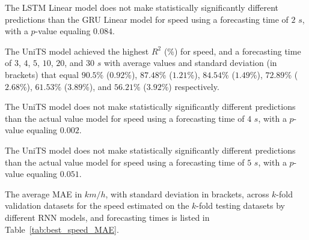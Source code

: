 The LSTM Linear model does not make statistically significantly different predictions than the GRU Linear model for speed using a forecasting time of $2$ $s$, with a $p$-value equaling $0.084$.

The UniTS model achieved the highest $R^{2}$ (\%) for speed, and a forecasting time of $3$, $4$, $5$, $10$, $20$, and $30$ $s$ with average values and standard deviation (in brackets) that equal $90.5$\% ($0.92$\%), $87.48$\% ($1.21$\%), $84.54$\% ($1.49$\%), $72.89$\% ($2.68$\%), $61.53$\% ($3.89$\%), and $56.21$\% ($3.92$\%) respectively.

The UniTS model does not make statistically significantly different predictions than the actual value model for speed using a forecasting time of $4$ $s$, with a $p$-value equaling $0.002$.

The UniTS model does not make statistically significantly different predictions than the actual value model for speed using a forecasting time of $5$ $s$, with a $p$-value equaling $0.051$.

The average MAE in $km/h$, with standard deviation in brackets, across $k$-fold validation datasets for the speed estimated on the $k$-fold testing datasets by different RNN models, and forecasting times is listed in Table~\ref{tab:best_speed_MAE}.

\begin{table}[!ht]
	\centering
	\caption{The average MAE in $km/h$, with standard deviation in brackets, across $k$-fold validation datasets for the speed estimated on the $k$-fold testing datasets by different RNN models, and forecasting times.}
	\label{tab:best_speed_MAE}
\end{table}


